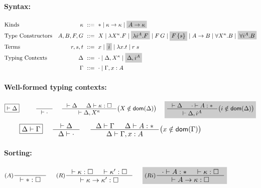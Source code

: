 \begin{figure}
\begin{framed}
\paragraph{Syntax:}
\begin{align*}
\!\!\!\!\!\!\!\!&\text{Kinds}
 	& \kappa		&~ ::= ~ *
				\mid \kappa -> \kappa
				\mid \newFi{A -> \kappa}
\\
\!\!\!\!\!\!\!\!&\text{Type Constructors}
	& A,B,F,G		&~ ::= ~ X
				\mid \lambda X^\kappa.F
				\mid \newFi{\lambda i^A.F}
				\mid F\,G
				\mid \newFi{F\,\{s\}}
				\mid A -> B
				\mid \forall X^\kappa . B
				\mid \newFi{\forall i^A . B}
\\
\!\!\!\!\!\!\!\!&\text{Terms}
	& r,s,t			&~ ::= ~ x \mid \newFi{i}
                                \mid \lambda x.t \mid r\;s
\\
\!\!\!\!\!\!\!\!&\text{Typing Contexts}
	& \Delta		&~ ::= ~ \cdot
				\mid \Delta, X^\kappa
				\mid \newFi{\Delta, i^A} \\
&	& \Gamma		&~ ::= ~ \cdot
				\mid \Gamma, x : A
\end{align*}

\paragraph{Well-formed typing contexts:}
\[ \fbox{$|- \Delta$}
 ~~~~ ~~~~
   \inference{}{|- \cdot}
 ~~~~
   \inference{|- \Delta & \Delta |- \kappa:\square}
             {|- \Delta,X^\kappa}
      \big( X\notin\dom(\Delta) \big)
 ~~~~ \newFi{
   \inference{|- \Delta & \cdot |- A:*}
             {|- \Delta,i^A}
      \big( i\notin\dom(\Delta) \big) }
\]
\[ \fbox{$\Delta |- \Gamma$}
 ~~~~
   \inference{|- \Delta}{\Delta |- \cdot}
 ~~~~
   \inference{\Delta |- \Gamma & \Delta |- A:*}
             {\Delta |- \Gamma,x:A}
      \big( x\notin\dom(\Gamma) \big)
\]


\paragraph{Sorting:} \fbox{$|- \kappa : \square$}
\[ \inference[($A$)]{}{|- *:\square}
 ~~~~
   \inference[($R$)]{|- \kappa:\square & |- \kappa':\square}
                    {|- \kappa -> \kappa' : \square}
 ~~~~
   \newFi{
   \inference[($Ri$)]{\cdot |- A:* & |- \kappa:\square}
                     {|- A -> \kappa : \square} }
\]


\end{framed}
\end{figure}
